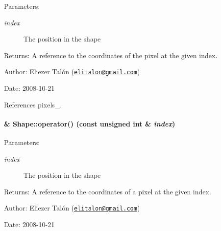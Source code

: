 \begin{Desc}
\item[Parameters:]
\begin{description}
\item[{\em index}]The position in the shape\end{description}
\end{Desc}
\begin{Desc}
\item[Returns:]A reference to the coordinates of the pixel at the given index.\end{Desc}
\begin{Desc}
\item[Author:]Eliezer Talón (\href{mailto:elitalon@gmail.com}{\tt elitalon@gmail.com}) \end{Desc}
\begin{Desc}
\item[Date:]2008-10-21 \end{Desc}


References pixels\_\-.\hypertarget{class_shape_7d12f3a76e2bfb7963c00237eba41e0a}{
\paragraph[{operator()}]{ \& Shape::operator() (const unsigned int \& {\em index})}\hfill}
\label{class_shape_7d12f3a76e2bfb7963c00237eba41e0a}


\begin{Desc}
\item[Parameters:]
\begin{description}
\item[{\em index}]The position in the shape\end{description}
\end{Desc}
\begin{Desc}
\item[Returns:]A reference to the coordinates of a pixel at the given index.\end{Desc}
\begin{Desc}
\item[Author:]Eliezer Talón (\href{mailto:elitalon@gmail.com}{\tt elitalon@gmail.com}) \end{Desc}
\begin{Desc}
\item[Date:]2008-10-21 \end{Desc}


